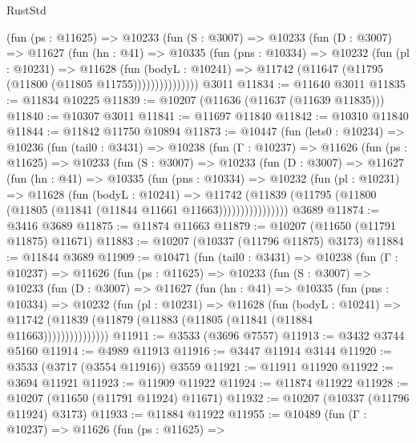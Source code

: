 \begin{lexlean}{RustStd}
\begin{coremodule}
            (fun (ps : @11625) =>
            @10233
              (fun (S : @3007) =>
              @10233
                (fun (D : @3007) =>
                @11627
                  (fun (hn : @41) =>
                  @10335
                    (fun (pns : @10334) =>
                    @10232
                      (fun (pl : @10231) =>
                      @11628
                        (fun (bodyL : @10241) =>
                        @11742 (@11647 (@11795 (@11800 (@11805 @11755)))))))))))))))
    @3011
@11834 := @11640 @3011
@11835 := @11834 @10225
@11839 := @10207 (@11636 (@11637 (@11639 @11835)))
@11840 := @10307 @3011
@11841 := @11697 @11840
@11842 := @10310 @11840
@11844 := @11842 @11750 @10894
@11873 := @10447
    (fun (lets0 : @10234) =>
    @10236
      (fun (tail0 : @3431) =>
      @10238
        (fun (Γ : @10237) =>
        @11626
          (fun (ps : @11625) =>
          @10233
            (fun (S : @3007) =>
            @10233
              (fun (D : @3007) =>
              @11627
                (fun (hn : @41) =>
                @10335
                  (fun (pns : @10334) =>
                  @10232
                    (fun (pl : @10231) =>
                    @11628
                      (fun (bodyL : @10241) =>
                      @11742
                        (@11839
                          (@11795 (@11800 (@11805 (@11841 (@11844 @11661 @11663))))))))))))))))
    @3689
@11874 := @3416 @3689
@11875 := @11874 @11663
@11879 := @10207 (@11650 (@11791 @11875) @11671)
@11883 := @10207 (@10337 (@11796 @11875) @3173)
@11884 := @11844 @3689
@11909 := @10471
    (fun (tail0 : @3431) =>
    @10238
      (fun (Γ : @10237) =>
      @11626
        (fun (ps : @11625) =>
        @10233
          (fun (S : @3007) =>
          @10233
            (fun (D : @3007) =>
            @11627
              (fun (hn : @41) =>
              @10335
                (fun (pns : @10334) =>
                @10232
                  (fun (pl : @10231) =>
                  @11628
                    (fun (bodyL : @10241) =>
                    @11742 (@11839 (@11879 (@11883 (@11805 (@11841 (@11884 @11663)))))))))))))))
@11911 := @3533 (@3696 @7557)
@11913 := @3432 @3744 @5160
@11914 := @4989 @11913
@11916 := @3447 @11914 @3144
@11920 := @3533 (@3717 (@3554 @11916)) @3559
@11921 := @11911 @11920
@11922 := @3694 @11921
@11923 := @11909 @11922
@11924 := @11874 @11922
@11928 := @10207 (@11650 (@11791 @11924) @11671)
@11932 := @10207 (@10337 (@11796 @11924) @3173)
@11933 := @11884 @11922
@11955 := @10489
    (fun (Γ : @10237) =>
    @11626
      (fun (ps : @11625) =>

\end{coremodule}
\end{lexlean}
